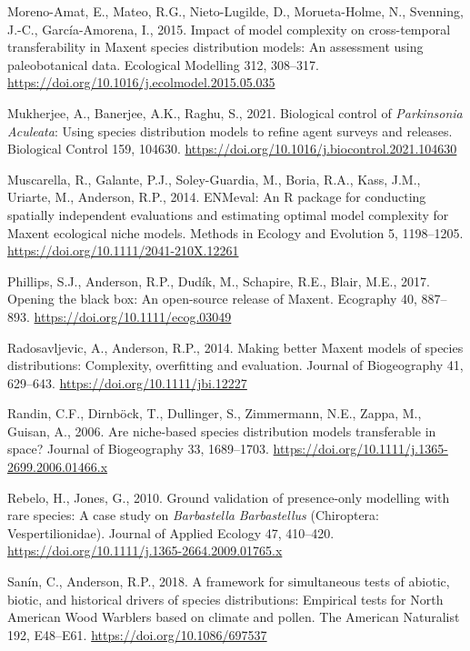\documentclass[12pt,]{article}
\begin{document}
\begin{CSLReferences}{1}{0}
\leavevmode\hypertarget{ref-Moreno-Amat2015}{}%
Moreno-Amat, E., Mateo, R.G., Nieto-Lugilde, D., Morueta-Holme, N.,
Svenning, J.-C., García-Amorena, I., 2015. Impact of model complexity on
cross-temporal transferability in {Maxent} species distribution models:
{An} assessment using paleobotanical data. Ecological Modelling 312,
308--317. \url{https://doi.org/10.1016/j.ecolmodel.2015.05.035}

\leavevmode\hypertarget{ref-Mukherjee2021}{}%
Mukherjee, A., Banerjee, A.K., Raghu, S., 2021. Biological control of
{\emph{Parkinsonia}}{ \emph{Aculeata}}: {Using} species distribution
models to refine agent surveys and releases. Biological Control 159,
104630. \url{https://doi.org/10.1016/j.biocontrol.2021.104630}

\leavevmode\hypertarget{ref-Muscarella2014}{}%
Muscarella, R., Galante, P.J., Soley-Guardia, M., Boria, R.A., Kass,
J.M., Uriarte, M., Anderson, R.P., 2014. {ENMeval}: {An R} package for
conducting spatially independent evaluations and estimating optimal
model complexity for {Maxent} ecological niche models. Methods in
Ecology and Evolution 5, 1198--1205.
\url{https://doi.org/10.1111/2041-210X.12261}

\leavevmode\hypertarget{ref-Phillips2017}{}%
Phillips, S.J., Anderson, R.P., Dudík, M., Schapire, R.E., Blair, M.E.,
2017. Opening the black box: An open-source release of {Maxent}.
Ecography 40, 887--893. \url{https://doi.org/10.1111/ecog.03049}

\leavevmode\hypertarget{ref-Radosavljevic2014}{}%
Radosavljevic, A., Anderson, R.P., 2014. Making better {Maxent} models
of species distributions: Complexity, overfitting and evaluation.
Journal of Biogeography 41, 629--643.
\url{https://doi.org/10.1111/jbi.12227}

\leavevmode\hypertarget{ref-Randin2006}{}%
Randin, C.F., Dirnböck, T., Dullinger, S., Zimmermann, N.E., Zappa, M.,
Guisan, A., 2006. Are niche-based species distribution models
transferable in space? Journal of Biogeography 33, 1689--1703.
\url{https://doi.org/10.1111/j.1365-2699.2006.01466.x}

\leavevmode\hypertarget{ref-Rebelo2010}{}%
Rebelo, H., Jones, G., 2010. Ground validation of presence-only
modelling with rare species: A case study on {\emph{Barbastella}}{
\emph{Barbastellus}} ({Chiroptera}: {Vespertilionidae}). Journal of
Applied Ecology 47, 410--420.
\url{https://doi.org/10.1111/j.1365-2664.2009.01765.x}

\leavevmode\hypertarget{ref-Sanin2018}{}%
Sanín, C., Anderson, R.P., 2018. A framework for simultaneous tests of
abiotic, biotic, and historical drivers of species distributions:
Empirical tests for {North American Wood Warblers} based on climate and
pollen. The American Naturalist 192, E48--E61.
\url{https://doi.org/10.1086/697537}


\end{CSLReferences}
\end{document}
